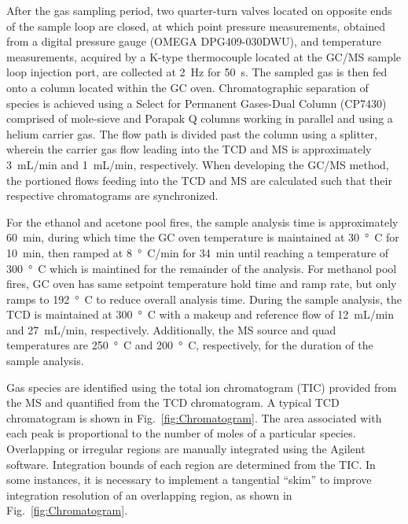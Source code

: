 \documentclass[12pt]{article}
\begin{document}
After the gas sampling period, two quarter-turn valves located on opposite ends of the sample loop are closed, at which point pressure measurements, obtained from a digital pressure gauge (OMEGA DPG409-030DWU), and temperature measurements, acquired by a K-type thermocouple located at the GC/MS sample loop injection port, are collected at \SI{2}{\hertz} for \SI{50}{s}. The sampled gas is then fed onto a column located within the GC oven. Chromatographic separation of species is achieved using a Select for Permanent Gases-Dual Column (CP7430) comprised of mole-sieve and Porapak Q columns working in parallel and using a helium carrier gas. The flow path is divided past the column using a splitter, wherein the carrier gas flow leading into the TCD and MS is approximately 3~mL/min and 1~mL/min, respectively. When developing the GC/MS method, the portioned flows feeding into the TCD and MS are calculated such that their respective chromatograms are synchronized.

For the ethanol and acetone pool fires, the sample analysis time is approximately \SI{60}{min}, during which time the GC oven temperature is maintained at \SI{30}{\degree C} for \SI{10}{min}, then ramped at \SI{8}{\degree C/min} for \SI{34}{min} until reaching a temperature of \SI{300}{\degree C} which is maintined for the remainder of the analysis. For methanol pool fires, GC oven has same setpoint temperature hold time and ramp rate, but only ramps to \SI{192}{\degree C} to reduce overall analysis time. During the sample analysis, the TCD is maintained at \SI{300}{\degree C} with a makeup and reference flow of 12~mL/min and 27~mL/min, respectively. Additionally, the MS source and quad temperatures are \SI{250}{\degree C} and \SI{200}{\degree C}, respectively, for the duration of the sample analysis.

Gas species are identified using the total ion chromatogram (TIC) provided from the MS and quantified from the TCD chromatogram. A typical TCD chromatogram is shown in Fig.~\ref{fig:Chromatogram}. The area associated with each peak is proportional to the number of moles of a particular species. Overlapping or irregular regions are manually integrated using the Agilent software. Integration bounds of each region are determined from the TIC. In some instances, it is necessary to implement a tangential ``skim'' to improve integration resolution of an overlapping region, as shown in Fig.~\ref{fig:Chromatogram}.
\end{document}
